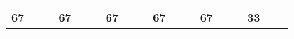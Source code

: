 \begin{landscape}
\begin{table}[h!]
\begin{tabular}{lcllcllcllcllcllcl}
\multicolumn{1}{|l|}{67}  & \multicolumn{1}{c|}{}                                                                                                   & \multicolumn{1}{l|}{}        & \multicolumn{1}{l|}{67} & \multicolumn{1}{c|}{}                                                                                                      & \multicolumn{1}{l|}{}         & \multicolumn{1}{l|}{67} & \multicolumn{1}{c|}{}                                                                                                   & \multicolumn{1}{l|}{}         & \multicolumn{1}{l|}{67} & \multicolumn{1}{c|}{}                                                                                            & \multicolumn{1}{l|}{}         & \multicolumn{1}{l|}{67} & \multicolumn{1}{c|}{}                                                                                                              & \multicolumn{1}{l|}{}         & \multicolumn{1}{l|}{33} & \multicolumn{1}{c|}{}                                                                                                        & \multicolumn{1}{l|}{}         \\ \hline
                          & \multicolumn{1}{l}{}                                                                                                    &                              &                         & \multicolumn{1}{l}{}                                                                                                       &                               &                         & \multicolumn{1}{l}{}                                                                                                    &                               &                         & \multicolumn{1}{l}{}                                                                                             &                               &                         & \multicolumn{1}{l}{}                                                                                                               &                               &                         & \multicolumn{1}{l}{}                                                                                                         &                               \\ \hline

\end{tabular}
\end{table}
\end{landscape}

